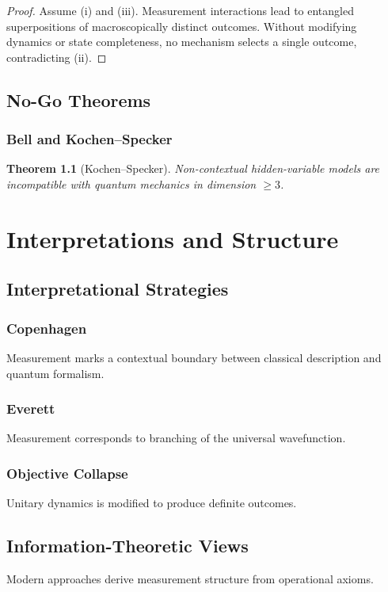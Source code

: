 \documentclass[12pt]{book}
\theoremstyle{plain}
\newtheorem{theorem}{Theorem}[chapter]
\theoremstyle{definition}
\theoremstyle{remark}
\begin{document}
\begin{proof}
Assume (i) and (iii). Measurement interactions lead to entangled superpositions of macroscopically distinct outcomes. Without modifying dynamics or state completeness, no mechanism selects a single outcome, contradicting (ii).
\end{proof}

\chapter{No-Go Theorems}

\section{Bell and Kochen--Specker}

\begin{theorem}[Kochen--Specker]
Non-contextual hidden-variable models are incompatible with quantum mechanics in dimension $\ge 3$.
\end{theorem}

\part{Interpretations and Structure}

\chapter{Interpretational Strategies}

\section{Copenhagen}
Measurement marks a contextual boundary between classical description and quantum formalism.

\section{Everett}
Measurement corresponds to branching of the universal wavefunction.

\section{Objective Collapse}
Unitary dynamics is modified to produce definite outcomes.

\chapter{Information-Theoretic Views}
Modern approaches derive measurement structure from operational axioms.
\end{document}
